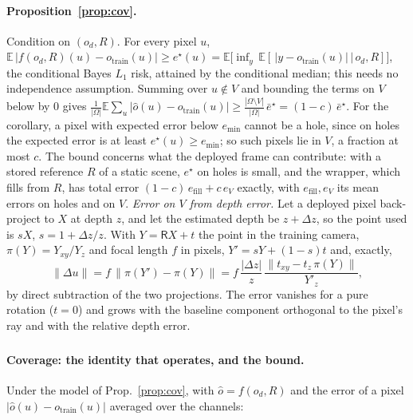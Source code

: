 \documentclass{article}
\newcommand{\ph}{\textsuperscript{\dag}}
\begin{document}
\paragraph{Proposition~\ref{prop:cov}.} Condition on $(o_d, R)$. For every pixel $u$, $\mathbb{E}\,|f(o_d,R)(u) -
o_{\mathrm{train}}(u)| \ge e^\star(u) = \mathbb{E}\big[\inf_{y}\, \mathbb{E}[\,|y - o_{\mathrm{train}}(u)|\,\big|\,
o_d, R]\big]$, the conditional Bayes $L_1$ risk, attained by the conditional median; this needs no independence
assumption. Summing over $u \notin V$ and bounding the terms on $V$ below by 0 gives
$\frac{1}{|\Omega|}\mathbb{E}\sum_u |\hat o(u) - o_{\mathrm{train}}(u)| \ge \frac{|\Omega\setminus V|}{|\Omega|}\,
\bar e^\star = (1-c)\,\bar e^\star$. For the corollary, a pixel with expected error below $e_{\min}$ cannot be a hole,
since on holes the expected error is at least $e^\star(u) \ge e_{\min}$; so such pixels lie in $V$, a fraction at most
$c$. The bound concerns what the deployed frame can contribute: with a stored reference $R$ of a static scene,
$e^\star$ on holes is small, and the wrapper, which fills from $R$, has total error
$(1-c)\,e_{\mathrm{fill}} + c\,e_V$ exactly, with $e_{\mathrm{fill}}, e_V$ its mean errors on holes and on $V$.
\emph{Error on $V$ from depth error.} Let a deployed pixel back-project to $X$ at depth $z$, and let the estimated depth
be $z + \Delta z$, so the point used is $sX$, $s = 1 + \Delta z/z$. With $Y = \mathsf R X + t$ the point in the training
camera, $\pi(Y) = Y_{xy}/Y_z$ and focal length $f$ in pixels, $Y' = sY + (1-s)t$ and, exactly,
\begin{equation}
\|\Delta u\| = f\,\big\|\pi(Y') - \pi(Y)\big\| = f\,\frac{|\Delta z|}{z}\,\frac{\|t_{xy} - t_z\,\pi(Y)\|}{Y'_z},
\end{equation}
by direct subtraction of the two projections. The error vanishes for a pure rotation ($t = 0$) and grows with the
baseline component orthogonal to the pixel's ray and with the relative depth error.

\paragraph{Coverage: the identity that operates, and the bound\ph.}
Under the model of Prop.~\ref{prop:cov}, with $\hat o = f(o_d, R)$ and the error of a pixel $|\hat o(u) -
o_{\mathrm{train}}(u)|$ averaged over the channels:
\end{document}
